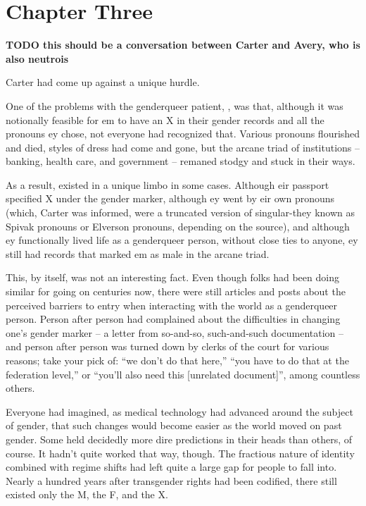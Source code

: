 \chapter*{Chapter Three}

\textbf{TODO this should be a conversation between Carter and Avery, who is also neutrois}

Carter had come up against a unique hurdle.

One of the problems with the genderqueer patient, \ptRJ, was that, although it was notionally feasible for em to have an X in their gender records and all the pronouns ey chose, not everyone had recognized that.  Various pronouns flourished and died, styles of dress had come and gone, but the arcane triad of institutions -- banking, health care, and government -- remaned stodgy and stuck in their ways.

As a result, \ptRJ existed in a unique limbo in some cases.  Although eir passport specified X under the gender marker, although ey went by eir own pronouns (which, Carter was informed, were a truncated version of singular-they known as Spivak pronouns or Elverson pronouns, depending on the source), and although ey functionally lived life as a genderqueer person, without close ties to anyone, ey still had records that marked em as male in the arcane triad.

This, by itself, was not an interesting fact.  Even though folks had been doing similar for going on centuries now, there were still articles and posts about the perceived barriers to entry when interacting with the world as a genderqueer person.  Person after person had complained about the difficulties in changing one's gender marker -- a letter from so-and-so, such-and-such documentation -- and person after person was turned down by clerks of the court for various reasons; take your pick of: ``we don't do that here,'' ``you have to do that at the federation level,'' or ``you'll also need this [unrelated document]'', among countless others.

Everyone had imagined, as medical technology had advanced around the subject of gender, that such changes would become easier as the world moved on past gender.  Some held decidedly more dire predictions in their heads than others, of course.  It hadn't quite worked that way, though.  The fractious nature of identity combined with regime shifts had left quite a large gap for people to fall into.  Nearly a hundred years after transgender rights had been codified, there still existed only the M, the F, and the X.

